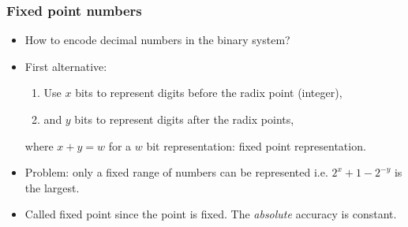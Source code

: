 \begin{frame}
  \frametitle{Fixed point numbers}
  \begin{itemize}
  \item How to encode decimal numbers in the binary system?
  \item First alternative:
   \begin{enumerate}
   \item Use $x$ bits to represent digits before the radix point (integer),
   \item and $y$ bits to represent digits after the radix points,
   \end{enumerate}
    where $x+y = w$ for a $w$ bit representation: fixed point representation.
  \item Problem: only a fixed range of numbers can be represented i.e.
    $2^x + 1 - 2^{-y}$ is the largest.
  \item Called fixed point since the point is fixed. The
    \emph{absolute} accuracy is constant.
  \end{itemize}


\begin{center}
\end{center}

\end{frame}


